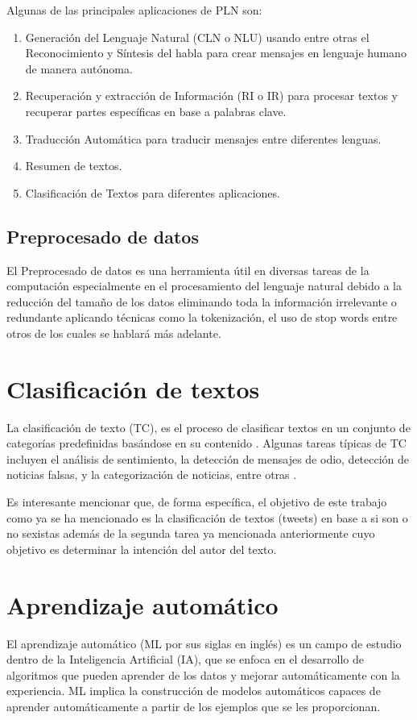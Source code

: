 Algunas de las principales aplicaciones de PLN son\cite{hernandez2013aplicaciones}:   
    \begin{enumerate}
         \item Generación del Lenguaje Natural (CLN o NLU) usando entre otras el Reconocimiento y Síntesis del habla para crear mensajes en lenguaje humano de manera autónoma.
        \item Recuperación y extracción de Información (RI o IR) para procesar textos y recuperar partes específicas en base a palabras clave.
        \item Traducción Automática para traducir mensajes entre diferentes lenguas.
        \item Resumen de textos.
        \item Clasificación de Textos para diferentes aplicaciones.
    \end{enumerate}

\subsection{Preprocesado de datos}
El Preprocesado de datos \cite{kotsiantis2006data} es una herramienta útil en diversas tareas de la computación especialmente en el procesamiento del lenguaje natural debido a la reducción del tamaño de los datos eliminando toda la información irrelevante o redundante aplicando técnicas como la tokenización, el uso de stop words entre otros de los cuales se hablará más adelante.


\section{Clasificación de textos}
La clasificación de texto (TC), es el proceso de clasificar textos en un conjunto de categorías predefinidas basándose en su contenido \cite{kowsari2019text}. Algunas tareas típicas de TC incluyen el análisis de sentimiento, la detección de mensajes de odio, detección de noticias falsas, y la categorización de noticias, entre otras \cite{minaee2021deep}. 

Es interesante mencionar que, de forma específica, el objetivo de este trabajo como ya se ha mencionado es la clasificación de textos (tweets) en base a si son o no sexistas además de la segunda tarea ya mencionada anteriormente cuyo objetivo es determinar la intención del autor del texto.

\section{Aprendizaje automático}
El aprendizaje automático (ML por sus siglas en inglés) es un campo de estudio dentro de la Inteligencia Artificial (IA), que se enfoca en el desarrollo de algoritmos que pueden aprender de los datos y mejorar automáticamente con la experiencia. ML implica la construcción de modelos automáticos capaces de aprender automáticamente a partir de los ejemplos que se les proporcionan\cite{kersting2018machine}. 

